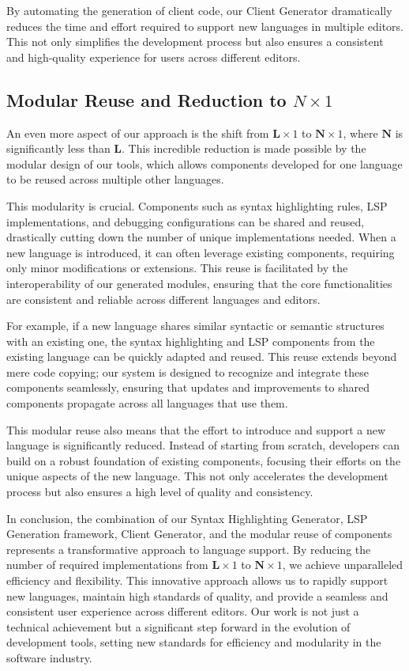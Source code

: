 By automating the generation of client code, our Client Generator dramatically reduces the time and effort required to support new languages in multiple editors. This not only simplifies the development process but also ensures a consistent and high-quality experience for users across different editors.

\subsection{Modular Reuse and Reduction to $N \times 1$} \label{subsec:concept:ModularReuseAndReductionToNtimes1}

An even more aspect of our approach is the shift from $\mathbf{L} \times 1$ to $\mathbf{N} \times 1$, where $\mathbf{N}$ is significantly less than $\mathbf{L}$. This incredible reduction is made possible by the modular design of our tools, which allows components developed for one language to be reused across multiple other languages.

This modularity is crucial. Components such as syntax highlighting rules, LSP implementations, and debugging configurations can be shared and reused, drastically cutting down the number of unique implementations needed. When a new language is introduced, it can often leverage existing components, requiring only minor modifications or extensions. This reuse is facilitated by the interoperability of our generated modules, ensuring that the core functionalities are consistent and reliable across different languages and editors.

For example, if a new language shares similar syntactic or semantic structures with an existing one, the syntax highlighting and LSP components from the existing language can be quickly adapted and reused. This reuse extends beyond mere code copying; our system is designed to recognize and integrate these components seamlessly, ensuring that updates and improvements to shared components propagate across all languages that use them.

This modular reuse also means that the effort to introduce and support a new language is significantly reduced. Instead of starting from scratch, developers can build on a robust foundation of existing components, focusing their efforts on the unique aspects of the new language. This not only accelerates the development process but also ensures a high level of quality and consistency.

In conclusion, the combination of our Syntax Highlighting Generator, LSP Generation framework, Client Generator, and the modular reuse of components represents a transformative approach to language support. By reducing the number of required implementations from $\mathbf{L} \times 1$ to $\mathbf{N} \times 1$, we achieve unparalleled efficiency and flexibility. This innovative approach allows us to rapidly support new languages, maintain high standards of quality, and provide a seamless and consistent user experience across different editors. Our work is not just a technical achievement but a significant step forward in the evolution of development tools, setting new standards for efficiency and modularity in the software industry.

